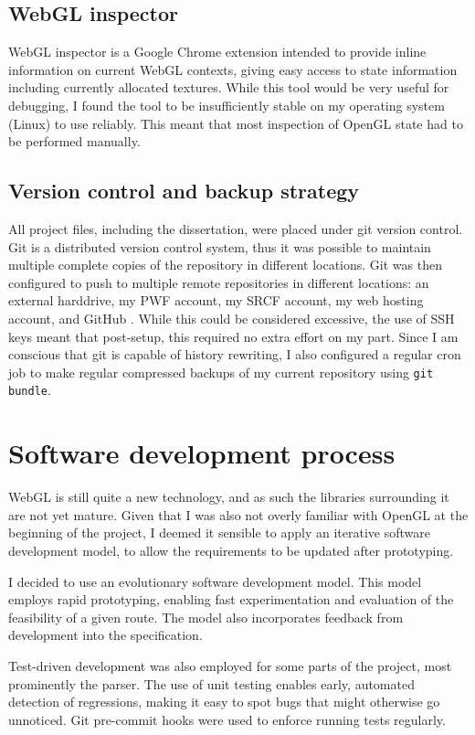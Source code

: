 \documentclass[12pt,twoside,notitlepage]{report}
\begin{document}
\subsection*{WebGL inspector}
WebGL inspector is a Google Chrome extension intended to provide inline information on current WebGL contexts, giving easy access to state information including currently allocated textures. While this tool would be very useful for debugging, I found the tool to be insufficiently stable on my operating system (Linux) to use reliably. This meant that most inspection of OpenGL state had to be performed manually.


\subsection*{Version control and backup strategy}
All project files, including the dissertation, were placed under git version control. Git is a distributed version control system, thus it was possible to maintain multiple complete copies of the repository in different locations. Git was then configured to push to multiple remote repositories in different locations: an external harddrive, my PWF account, my SRCF account, my web hosting account, and GitHub \citep{github}. While this could be considered excessive, the use of SSH keys meant that post-setup, this required no extra effort on my part. Since I am conscious that git is capable of history rewriting, I also configured a regular cron job to make regular compressed backups of my current repository using \texttt{git bundle}.

\section{Software development process}
WebGL is still quite a new technology, and as such the libraries surrounding it are not yet mature. Given that I was also not overly familiar with OpenGL at the beginning of the project, I deemed it sensible to apply an iterative software development model, to allow the requirements to be updated after prototyping. 

I decided to use an evolutionary software development model. This model employs rapid prototyping, enabling fast experimentation and evaluation of the feasibility of a given route. The model also incorporates feedback from development into the specification.

Test-driven development was also employed for some parts of the project, most prominently the parser. The use of unit testing enables early, automated detection of regressions, making it easy to spot bugs that might otherwise go unnoticed. Git pre-commit hooks were used to enforce running tests regularly.
\end{document}
